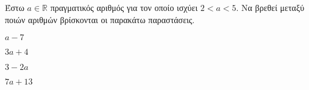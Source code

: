 Έστω $ a\in\mathbb{R} $ πραγματικός αριθμός για τον οποίο ισχύει $ 2<a<5 $. Να βρεθεί μεταξύ ποιών αριθμών βρίσκονται οι παρακάτω παραστάσεις.
\begin{multicols}{2}
\begin{alist}
\item $ a-7 $
\item $ 3a+4 $
\item $ 3-2a $
\item $ 7a+13 $
\end{alist}
\end{multicols}
